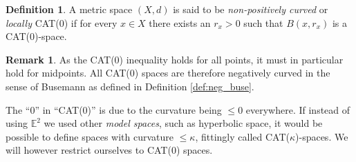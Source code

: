 \documentclass[11pt, a4paper, oneside]{memoir}
\theoremstyle{plain}\newtheorem{theorem}[subsection]{Theorem}
\theoremstyle{definition}
\newtheorem{definition}[subsection]{Definition}
\newtheorem{remark}[subsection]{Remark}
\newcommand{\E}{\mathbb{E}}
\begin{document}
\begin{definition}\label{def:loc_cat}
A metric space \((X,d)\) is said to be \textit{non-positively curved} or \textit{locally} CAT($0$) if for every \(x\in X\) there exists an \(r_x>0\) such that \(B(x,r_x)\) is a CAT($0$)-space.
\end{definition}
\begin{remark}
As the CAT($0$) inequality holds for all points, it must in particular hold for midpoints.
All CAT($0$) spaces are therefore negatively curved in the sense of Busemann as defined in Definition \ref{def:neg_buse}.
\end{remark}

The ``$0$'' in ``CAT($0$)'' is due to the curvature being \(\leq 0\) everywhere.
If instead of using \(\E^2\) we used other \textit{model spaces}, such as hyperbolic space, it would be possible to define spaces with curvature \(\leq \kappa\), fittingly called CAT(\(\kappa\))-spaces.
We will however restrict ourselves to CAT($0$) spaces.
\end{document}
